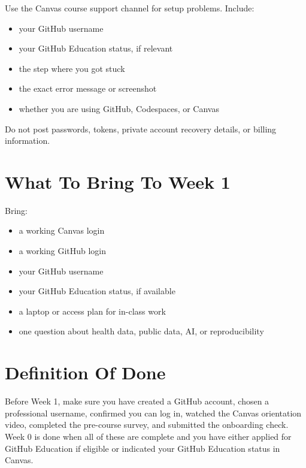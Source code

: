 \documentclass[
  letterpaper,
  DIV=11,
  numbers=noendperiod,
  oneside]{scrreprt}
\providecommand{\tightlist}{%
  \setlength{\itemsep}{0pt}\setlength{\parskip}{0pt}}
\begin{document}

Use the Canvas course support channel for setup problems. Include:

\begin{itemize}
\tightlist
\item
  your GitHub username
\item
  your GitHub Education status, if relevant
\item
  the step where you got stuck
\item
  the exact error message or screenshot
\item
  whether you are using GitHub, Codespaces, or Canvas
\end{itemize}

Do not post passwords, tokens, private account recovery details, or
billing information.

\section*{What To Bring To Week 1}\label{what-to-bring-to-week-1}


Bring:

\begin{itemize}
\tightlist
\item
  a working Canvas login
\item
  a working GitHub login
\item
  your GitHub username
\item
  your GitHub Education status, if available
\item
  a laptop or access plan for in-class work
\item
  one question about health data, public data, AI, or reproducibility
\end{itemize}

\section*{Definition Of Done}\label{definition-of-done}


Before Week 1, make sure you have created a GitHub account, chosen a
professional username, confirmed you can log in, watched the Canvas
orientation video, completed the pre-course survey, and submitted the
onboarding check. Week 0 is done when all of these are complete and you
have either applied for GitHub Education if eligible or indicated your
GitHub Education status in Canvas.
\end{document}
